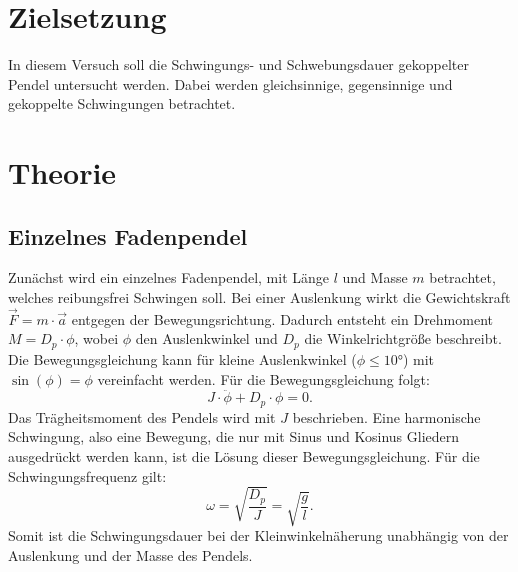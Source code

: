 \section{Zielsetzung}
In diesem Versuch soll die Schwingungs- und Schwebungsdauer gekoppelter Pendel untersucht werden.
Dabei werden gleichsinnige, gegensinnige und gekoppelte Schwingungen betrachtet.
\section{Theorie}
\label{sec:Theorie}
\subsection{Einzelnes Fadenpendel}
Zunächst wird ein einzelnes Fadenpendel, mit Länge $l$ und Masse $m$ betrachtet,
welches reibungsfrei Schwingen soll.
Bei einer Auslenkung wirkt die Gewichtskraft $\vec{F} = m \cdot \vec{a}$ entgegen der Bewegungsrichtung.
Dadurch entsteht ein Drehmoment $M = D_p \cdot \phi$, wobei $\phi$ den Auslenkwinkel und $D_p$ die Winkelrichtgröße beschreibt.
Die Bewegungsgleichung kann für kleine Auslenkwinkel ($\phi \leq 10°$) mit $\sin(\phi)= \phi$ vereinfacht werden.
Für die Bewegungsgleichung folgt:
\begin{equation*}
    J \cdot \ddot{\phi} + D_p \cdot \phi = 0.
\end{equation*}
Das Trägheitsmoment des Pendels wird mit $J$ beschrieben.
Eine harmonische Schwingung, also eine Bewegung, die nur mit Sinus und Kosinus Gliedern ausgedrückt werden kann, ist die Lösung dieser Bewegungsgleichung.
Für die Schwingungsfrequenz gilt:
\begin{equation*}
    \omega = \sqrt{\frac{D_p}{J}} = \sqrt{\frac{g}{l}}.
\end{equation*}
Somit ist die Schwingungsdauer bei der Kleinwinkelnäherung unabhängig von der Auslenkung und der Masse des Pendels.

